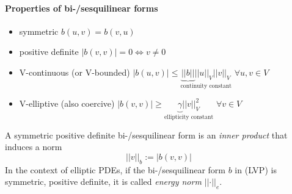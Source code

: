 \documentclass[english]{article}
\theoremstyle{definition}
\theoremstyle{remark}
\begin{document}
\paragraph{Properties of bi-/sesquilinear forms}
\begin{itemize}
\item symmetric $b\left(u,v\right)=b\left(v,u\right)$
\item positive definite $\left|b\left(v,v\right)\right|=0\iff v\neq0$
\item V-continuous (or V-bounded) $\left|b\left(u,v\right)\right|\le\underset{\mbox{continuity constant}}{\underbrace{\left|\left|b\right|\right|}\left|\left|u\right|\right|_{V}\left|\left|v\right|\right|_{V}}$
  $\forall u,v\in V$
\item V-elliptive (also coercive) $\left|b\left(v,v\right)\right|\ge\underset{\mbox{ellipticity constant}}{\underbrace{\gamma}\left|\left|v\right|\right|_{V}^{2}}$
  $\forall v\in V$
\end{itemize}
A symmetric positive definite bi-/sesquilinear form is an \emph{inner
  product} that induces a norm
\[
\left|\left|v\right|\right|_{b}:=\left|b\left(v,v\right)\right|
\]
In the context of elliptic PDEs, if the bi-/sesquilinear form $b$
in (LVP) is symmetric, positive definite, it is called \emph{energy
  norm} $\left|\left|\cdot\right|\right|_{e}$.

\end{document}
